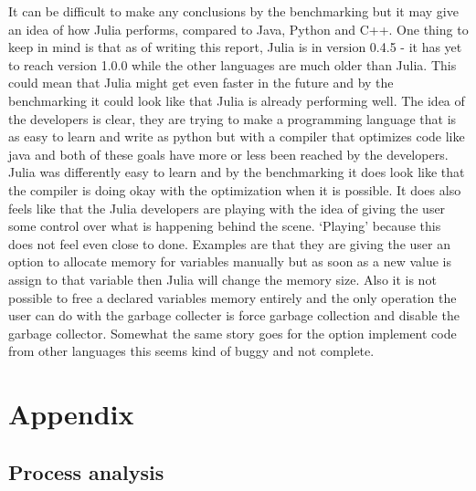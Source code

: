 \documentclass[a4paper, 11pt, titlepage]{article}
\begin{document}
It can be difficult to make any conclusions by the benchmarking but it may give an idea of how Julia performs, compared to Java, Python and C++. One thing to keep in mind is that as of writing this report, Julia is in version 0.4.5 - it has yet to reach version 1.0.0 while the other languages are much older than Julia. This could mean that Julia might get even faster in the future and by the benchmarking it could look like that Julia is already performing well. The idea of the developers is clear, they are trying to make a programming language that is as easy to learn and write as python but with a compiler that optimizes code like java and both of these goals have more or less been reached by the developers. Julia was differently easy to learn and by the benchmarking it does look like that the compiler is doing okay with the optimization when it is possible. It does also feels like that the Julia developers are playing with the idea of giving the user some control over what is happening behind the scene. ‘Playing’ because this does not feel even close to done. Examples are that they are giving the user an option to allocate memory for variables manually but as soon as a new value is assign to that variable then Julia will change the memory size. Also it is not possible to free a declared variables memory entirely and the only operation the user can do with the garbage collecter is force garbage collection and disable the garbage collector. Somewhat the same story goes for the option implement code from other languages this seems kind of buggy and not complete.

\newpage
\section{Appendix}
\subsection{Process analysis}
\end{document}
